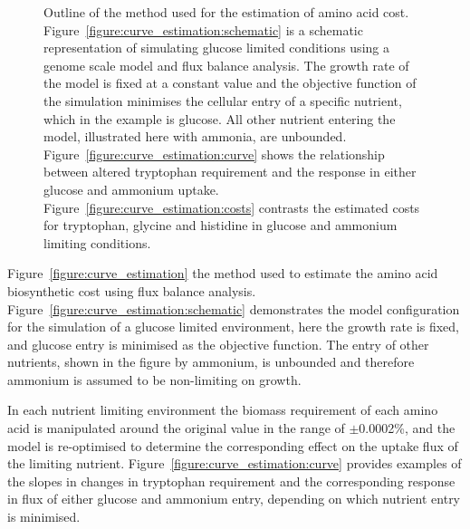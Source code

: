 \begin{figure}%
  \centering
  \hfill
  \hfill
  \hfill
  \caption[Method used for estimation of amino acid cost]{Outline of the method used for the estimation of amino acid cost. Figure~\ref{figure:curve_estimation:schematic} is a schematic representation of simulating glucose limited conditions using a genome scale model and flux balance analysis. The growth rate of the model is fixed at a constant value and the objective function of the simulation minimises the cellular entry of a specific nutrient, which in the example is glucose. All other nutrient entering the model, illustrated here with ammonia, are unbounded. Figure~\ref{figure:curve_estimation:curve} shows the relationship between altered tryptophan requirement and the response in either glucose and ammonium uptake. Figure~\ref{figure:curve_estimation:costs} contrasts the estimated costs for tryptophan, glycine and histidine in glucose and ammonium limiting conditions. }
  \label{figure:curve_estimation}
\end{figure}%

Figure~\vref{figure:curve_estimation} the method used to estimate the amino acid biosynthetic cost using flux balance analysis. Figure~\ref{figure:curve_estimation:schematic} demonstrates the model configuration for the simulation of a glucose limited environment, here the growth rate is fixed, and glucose entry is minimised as the objective function. The entry of other nutrients, shown in the figure by ammonium, is unbounded and therefore ammonium is assumed to be non-limiting on growth.

In each nutrient limiting environment the biomass requirement of each amino acid is manipulated around the original value in the range of $\pm$0.0002\%, and the model is re-optimised to determine the corresponding effect on the uptake flux of the limiting nutrient.  Figure~\ref{figure:curve_estimation:curve} provides examples of the slopes in  changes in tryptophan requirement and the corresponding response in flux of either glucose and ammonium entry, depending on which nutrient entry is minimised.

